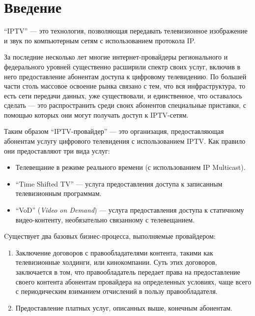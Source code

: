 \section*{Введение}

``IPTV'' --- это технология, позволяющая передавать телевизионное изображение и звук по компьютерным сетям с использованием протокола IP.

За последние несколько лет многие интернет-провайдеры регионального и федерального уровней существенно 
расширили спектр своих услуг, включив в него предоставление абонентам доступа к цифровому телевидению.
По большей части столь массовое освоение рынка связано с тем, что вся инфраструктура, то есть сети передачи данных, 
уже существовали, и единственное, что оставалось сделать --- это распространить среди своих абонентов специальные приставки, 
с помощью которых они могут получать доступ к IPTV-сетям.

Таким образом ``IPTV-провайдер'' --- это организация, предоставляющая абонентам услугу цифрового телевидения с использованием IPTV. Как правило они предоставляют три вида услуг:
\begin{itemize}

\item {
Телевещание в режиме реального времени (с использованием IP Multicast).
}

\item{
``Time Shifted TV'' --- услуга предоставления доступа к записанным телевизионным программам.
}

\item{
``VoD'' (\textit{Video on Demand}) --- услуга предоставления доступа к статичному видео-контенту, необязательно связанному с телевещанием.
}

\end{itemize}

Cуществует два базовых бизнес-процесса, выполняемые провайдером:

\begin{enumerate}

\item{
Заключение договоров с правообладателями контента, такими как телевизионные холдинги, или кинокомпании. 
Суть этих договоров, заключается в том, что правообладатель передает права на предоставление своего контента
абонентам провайдера на определенных условиях, чаще всего с периодическим взиманием отчислений в пользу правообладателя.
}
\item{
Предоставление платных услуг, описанных выше, конечным абонентам.
}

\end{enumerate}

